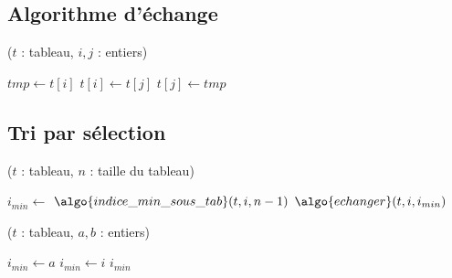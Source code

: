 

\subsection{Algorithme d'échange}

\begin{algorithm}[H]
\caption{($t$ : tableau, $i,j$ : entiers)}
\begin{algorithmic}[1]
\State $tmp \gets t[i]$ 
\State $t[i] \gets t[j]$ 
\State $t[j] \gets tmp$ 
\end{algorithmic}
\end{algorithm}



\subsection{Tri par sélection}

\begin{algorithm}[H]
\caption{($t$ : tableau, $n$ : taille du tableau)}
\begin{algorithmic}[1]
	\State $i_{min} \gets $ $\algo{indice\_min\_sous\_tab}(t, i, n-1)$
	\State $\algo{echanger}(t, i, i_{min})$ 
\EndFor
\end{algorithmic}
\end{algorithm}

\begin{algorithm}[H]
\caption{($t$ : tableau, $a, b$ : entiers)}
\label{indiceMin}
\begin{algorithmic}[1]
\State $i_{min} \gets a$
		\State $i_{min} \gets i$
	\EndIf
\EndFor
\State\Return $i_{min}$
\end{algorithmic}
\end{algorithm}



